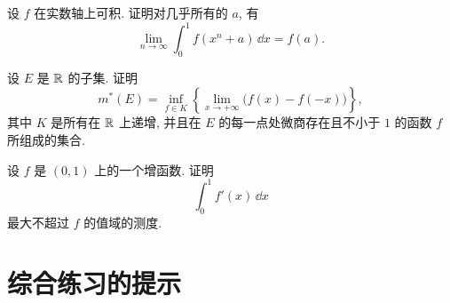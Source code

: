 \begin{exer}
	设 \(f\) 在实数轴上可积. 证明对几乎所有的 \(a\), 有
	\[
	\lim_{n\to\infty}\int_0^1 f(x^n+a)\,\dd x=f(a).
	\]
\end{exer}

\begin{exer}
	设 \(E\) 是 \(\mathbb{R}\) 的子集. 证明
	\[
	m^*(E)
	=
	\inf_{f\in K}
	\left\{
	\lim_{x\to+\infty}\bigl(f(x)-f(-x)\bigr)
	\right\},
	\]
	其中 \(K\) 是所有在 \(\mathbb{R}\) 上递增, 并且在 \(E\) 的每一点处微商存在且不小于 \(1\) 的函数 \(f\) 所组成的集合.
\end{exer}

\begin{exer}
	设 \(f\) 是 \((0,1)\) 上的一个增函数. 证明
	\[
	\int_0^1 f'(x)\,\dd x
	\]
	最大不超过 \(f\) 的值域的测度.
\end{exer}

\chapter{综合练习的提示}
\label{chap:comprehensive-exercise-hints}

